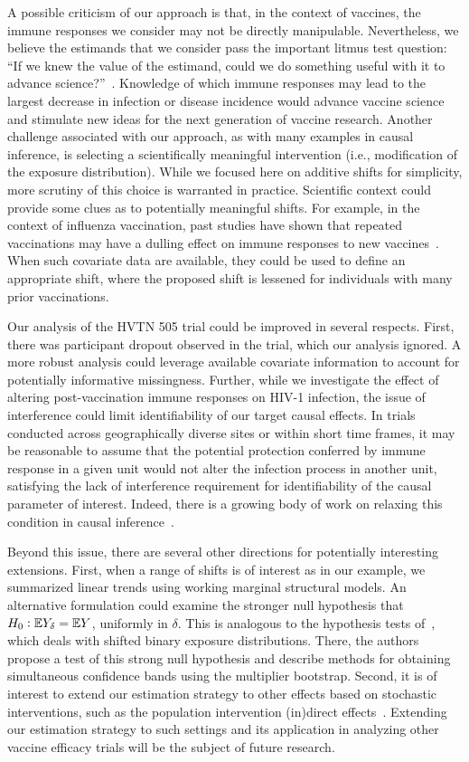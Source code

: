 A possible criticism of our approach is that, in the context of vaccines, the
immune responses we consider may not be directly manipulable. Nevertheless, we
believe the estimands that we consider pass the important litmus test question:
``If we knew the value of the estimand, could we do something useful with it to
advance science?''~\citep{gilbert2011commentary}. Knowledge of which immune
responses may lead to the largest decrease in infection or disease incidence
would advance vaccine science and stimulate new ideas for the next generation of
vaccine research. Another challenge associated with our approach, as with many
examples in causal inference, is selecting a scientifically meaningful
intervention (i.e., modification of the exposure distribution). While we focused
here on additive shifts for simplicity, more scrutiny of this choice is
warranted in practice. Scientific context could provide some clues as to
potentially meaningful shifts. For example, in the context of influenza
vaccination, past studies have shown that repeated vaccinations may have
a dulling effect on immune responses to new
vaccines~\citep{thompson2016effects}. When such covariate data are available,
they could be used to define an appropriate shift, where the proposed shift is
lessened for individuals with many prior vaccinations.

Our analysis of the HVTN 505 trial could be improved in several respects. First,
there was participant dropout observed in the trial, which our analysis ignored.
A more robust analysis could leverage available covariate information to account
for potentially informative missingness. Further, while we investigate the
effect of altering post-vaccination immune responses on HIV-1 infection, the
issue of interference could limit identifiability of our target causal effects.
In trials conducted across geographically diverse sites or within short time
frames, it may be reasonable to assume that the potential protection conferred
by immune response in a given unit would not alter the infection process in
another unit, satisfying the lack of interference requirement for
identifiability of the causal parameter of interest. Indeed, there is a growing
body of work on relaxing this condition in causal
inference~\citep[e.g.,][]{hudgens2008toward}.

Beyond this issue, there are several other directions for potentially
interesting extensions. First, when a range of shifts is of interest as in our
example, we summarized linear trends using working marginal structural models.
An alternative formulation could examine the stronger null hypothesis that
$H_0: \mathbb{E} Y_{\delta} = \mathbb{E} Y$, uniformly in $\delta$. This is analogous to the
hypothesis tests of~\citet{kennedy2019nonparametric}, which deals with shifted
binary exposure distributions. There, the authors propose a test of this strong
null hypothesis and describe methods for obtaining simultaneous confidence bands
using the multiplier bootstrap. Second, it is of interest to extend our
estimation strategy to other effects based on stochastic interventions, such as
the population intervention (in)direct effects~\citep{diaz2020causal}. Extending
our estimation strategy to such settings and its application in analyzing other
vaccine efficacy trials will be the subject of future research.

